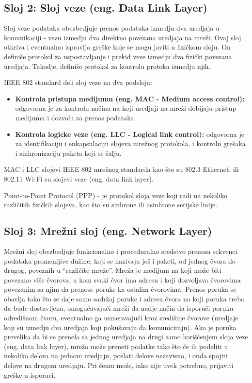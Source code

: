 \documentclass[a4paper,12pt, master]{etf}
\begin{document}
	\subsection{Sloj 2: Sloj veze (eng\@. Data Link Layer)}

	Sloj veze podataka obezbedjuje prenos podataka izmedju dva uredjaja u
	komunikaciji - vezu	izmedju dva direktno povezana uredjaja na mre\v{z}i.
	Ovaj sloj otkriva i eventualno ispravlja gre\v{s}ke koje se mogu javiti u
	fizi\v{c}kom sloju. On defini\v{s}e protokol za uspostavljanje i prekid
	veze izmedju dva fizi\v{c}ki povezana uredjaja. Takodje, defini\v{s}e
	protokol za kontrolu protoka izmedju njih.

	IEEE 802 standard deli sloj veze na dva podsloja:
	\begin{itemize}
		\item \textbf{Kontrola pristupa medijumu (eng\@. MAC - Medium access control):}
		odgovorna je za kontrolu na\v{c}ina na koji uredjaji na mre\v{z}i
		dobijaju pristup medijumu i	dozvolu za prenos podataka.
		\item \textbf{Kontrola logicke veze (eng\@. LLC - Logical link control):}
		odgovorna je za identifikaciju i enkapsulaciju slojeva mre\v{z}nog
		protokola, i kontrolu gre\v{s}aka i sinhronizaciju paketa koji se
		\v{s}alju.
	\end{itemize}

	MAC i LLC slojevi IEEE 802 mre\v{z}nog standarda kao \v{s}to su 802.3
	Ethernet, ili 802.11 Wi-Fi su slojevi veze (eng\@. data link layer).

	Point-to-Point Protocol (PPP) - je protokol sloja veze koji radi na
	nekoliko razli\v{c}itih	fizi\v{c}kih slojeva, kao \v{s}to su sinhrone ili
	asinhrone serijske linije.

	\subsection{Sloj 3: Mre\v{z}ni sloj (eng\@. Network Layer)}

	Mre\v{z}ni sloj obezbedjuje funkcionalno i proceduralno sredstvo prenosa
	sekvenci podataka promenljive du\v{z}ine, koji se nazivaju jo\v{s} i paketi,
	od jednog \v{c}vora do drugog, poveznih u ``razli\v{c}ite mre\v{z}e''.
	Mre\v{z}a je medijum na koji mo\v{z}e biti povezano vi\v{s}e \v{c}vorova, u
    kom svaki \v{c}vor ima adresu i koji dozvoljava \v{c}vorovima povezanim sa
	njim da prenose poruke ka ostalim \v{c}vorovima. Prenos poruka se obavlja
	tako \v{s}to se daje samo sadr\v{z}aj poruke i adresu \v{c}vora na koji
	poruka treba da bude dostavljena, omogu\'{c}avaju\'{c}i mre\v{z}i da nadje
	na\v{c}in da isporu\v{c}i poruku odredi\v{s}nom \v{c}voru, eventualno ga
	usmeravaju\'{c}i kroz sredi\v{s}nje \v{c}vorove (uredjaje koji su izmedju
	dva uredjaja koji poku\v{s}avaju da komuniciraju). Ako je poruka prevelika
	da bi se prenela sa jednog uredjaja na drugi samo kori\v{s}\'{c}enjem sloja
	veze (eng\@. data link layer), mre\v{z}a mo\v{z}e preneti podatke tako \v{s}to
	\'{c}e ih podeliti u nekoliko delova na jednom uredjaju, poslati delove
	nezavisno, i onda spojiti delove na drugom uredjaju. Pri \v{c}emu mo\v{z}e,
	iako nije uvek potrebno, prijaviti gre\v{s}ke u isporuci.
\end{document}
